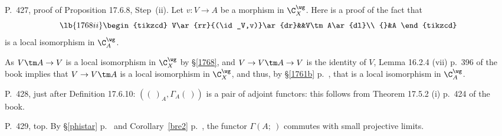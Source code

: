 \documentclass[12pt]{article}
\theoremstyle{remark}
\theoremstyle{definition}
\begin{document}
%

\begin{s}
P.~427, proof of Proposition 17.6.8, Step~(ii). Let $v:V\to A$ be a morphism in $\C_X^\wg$. Here is a proof of the fact that 
\begin{equation}\lb{1768ii}
\begin{tikzcd} 
V\ar{rr}{(\id_V,v)}\ar{dr}&&V\tm A\ar{dl}\\ 
{}&A
\end{tikzcd}
\end{equation} 
is a local isomorphism in $\C_A^\wg$. 

As $V\tm A\to V$ is a local isomorphism in $\C_X^\wg$ by \S\ref{1768}, and $V\to V\tm A\to V$ is the identity of $V$, Lemma 16.2.4 (vii) p.~396 of the book implies that $V\to V\tm A$ is a local isomorphism in $\C_X^\wg$, and thus, by \S\ref{1761b} p.~, that  is a local isomorphism in $\C_A^\wg$. 
\end{s} 

%

\begin{s}
P.~428, just after Definition 17.6.10: $((\ )_A,\Gamma_A(\ ))$ is a pair of adjoint functors: this follows from Theorem 17.5.2 (i) p.~424 of the book. 
\end{s} 

%

\begin{s}
P.~429, top. By \S\ref{phistar} p.~ and Corollary~\ref{bre2} p.~, the functor $\Gamma(A;\ )$ commutes with small projective limits. 
\end{s} 

%
\end{document}
